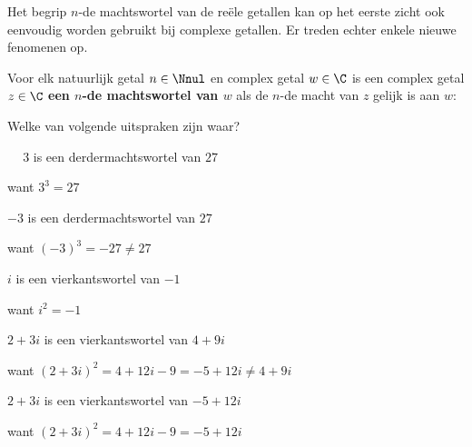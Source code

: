 \documentclass{ximera}
\begin{document}
    \author{Wim Obbels}
    \label{xim:complexe_machtswortels}

    \providecommand{\sg}{\phantom{+}}

    Het begrip $n$-de machtswortel van de reële getallen kan op het eerste zicht ook eenvoudig worden gebruikt bij complexe getallen. 
    Er treden echter enkele nieuwe fenomenen op.

    \begin{definition}\nl

    Voor elk natuurlijk getal $n\in \Nnul$ en complex getal $w\in\C$ is een complex getal $z\in\C$ \textbf{een $n$-de machtswortel van $w$}  als de $n$-de macht van $z$ gelijk is aan $w$:
 

    \end{definition}



    \begin{example} Welke van volgende uitspraken zijn waar?
        \begin{question} 
            \choiceTrue  $\sg3$ is een derdermachtswortel van $27$
            \begin{feedback} want $3^3 = 27$\end{feedback}
        \end{question}
        \begin{question} 
            \choiceFalse  $-3$ is een derdermachtswortel van $27$
            \begin{feedback} want $(-3)^3 = -27 \neq 27 $\end{feedback}
        \end{question}
        \begin{question} 
            \choiceTrue  $i$ is een vierkantswortel van $-1$
            \begin{feedback} want $i^2= -1$\end{feedback}
        \end{question}
        \begin{question} 
            \choiceFalse  $2+3i$ is een vierkantswortel van $4+9i$
            \begin{feedback} want $(2+3i)^2 = 4 + 12i - 9 = -5+12i \neq 4+9i$\end{feedback}
        \end{question}
        \begin{question} 
            \choiceTrue  $2+3i$ is een vierkantswortel van $-5+12i$
            \begin{feedback} want $(2+3i)^2 = 4 + 12i - 9 = -5+12i$\end{feedback}
        \end{question}

    \end{example}
\end{document}
